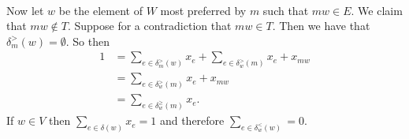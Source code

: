 \documentclass[letterpaper,12pt,oneside,onecolumn]{article}
\begin{document}
\paragraph{}
Now let $w$ be the element of $W$ most preferred by $m$ such that $mw \in E$. We claim that $mw \not\in T$. Suppose for a contradiction that $mw \in T$. Then we have that $\delta_m^>(w) = \emptyset$. So then
\begin{align*}
1 &= \sum_{e \in \delta_m^>(w)} x_e + \sum_{e \in \delta_w^>(m)} x_e + x_{mw} \\
 &= \sum_{e \in \delta_w^>(m)} x_e + x_{mw} \\
&= \sum_{e \in \delta_w^\geq(m)} x_e.
\end{align*}
If $w \in V$ then $\sum_{e \in \delta(w)} x_e = 1$ and therefore $\sum_{e \in \delta_w^<(w)} = 0$.
\end{document}
